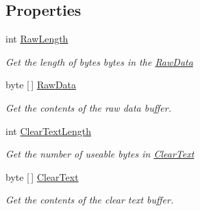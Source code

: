 \subsection*{Properties}
\begin{DoxyCompactItemize}
\item 
int \hyperlink{class_i_c_sharp_code_1_1_sharp_zip_lib_1_1_zip_1_1_compression_1_1_streams_1_1_inflater_input_buffer_a8cd0feb60c6e6e66cf2f3c9ff130e9a7}{Raw\+Length}
\begin{DoxyCompactList}\small\item\em Get the length of bytes bytes in the \hyperlink{class_i_c_sharp_code_1_1_sharp_zip_lib_1_1_zip_1_1_compression_1_1_streams_1_1_inflater_input_buffer_ad0322f1bb4cbb6e847a593e2a4210107}{Raw\+Data} \end{DoxyCompactList}\item 
byte \mbox{[}$\,$\mbox{]} \hyperlink{class_i_c_sharp_code_1_1_sharp_zip_lib_1_1_zip_1_1_compression_1_1_streams_1_1_inflater_input_buffer_ad0322f1bb4cbb6e847a593e2a4210107}{Raw\+Data}
\begin{DoxyCompactList}\small\item\em Get the contents of the raw data buffer. \end{DoxyCompactList}\item 
int \hyperlink{class_i_c_sharp_code_1_1_sharp_zip_lib_1_1_zip_1_1_compression_1_1_streams_1_1_inflater_input_buffer_a5f5b43e2db4e6dfa9df14dc634ac0e26}{Clear\+Text\+Length}
\begin{DoxyCompactList}\small\item\em Get the number of useable bytes in \hyperlink{class_i_c_sharp_code_1_1_sharp_zip_lib_1_1_zip_1_1_compression_1_1_streams_1_1_inflater_input_buffer_afb3996d89768e855a92703e6e8fac137}{Clear\+Text} \end{DoxyCompactList}\item 
byte \mbox{[}$\,$\mbox{]} \hyperlink{class_i_c_sharp_code_1_1_sharp_zip_lib_1_1_zip_1_1_compression_1_1_streams_1_1_inflater_input_buffer_afb3996d89768e855a92703e6e8fac137}{Clear\+Text}
\begin{DoxyCompactList}\small\item\em Get the contents of the clear text buffer. \end{DoxyCompactList}\item 

\end{DoxyCompactItemize}
